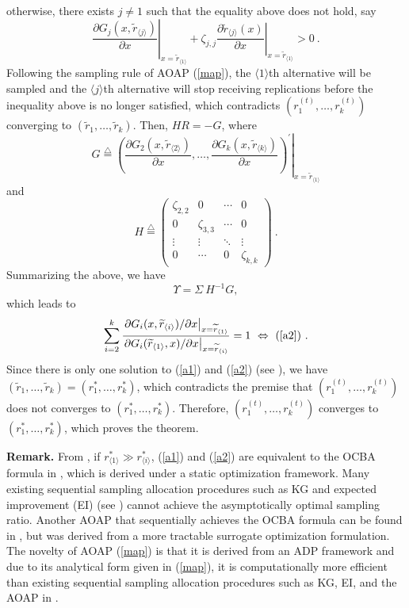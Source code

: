 \documentclass[journal]{IEEEtran}
\newcommand{\ed}{\stackrel{\triangle}{=}}
\begin{document}
\begin{IEEEproof}
     otherwise, there exists $j\neq 1$ such that the equality above does not hold, say 
      $$\left.\frac{\partial G_j(x,\widetilde{r}_{\langle j\rangle})}{\partial x}\right|_{x=\widetilde{r}_{\langle 1 \rangle}}+\zeta_{j,j}\left.\frac{\partial \widetilde{r}_{\langle j\rangle}(x)}{\partial x}\right|_{x=\widetilde{r}_{\langle 1 \rangle}}>0~.$$
      Following the sampling rule of AOAP (\ref{map}), the $\langle 1 \rangle$th alternative will be sampled and the $\langle j\rangle$th alternative will stop receiving replications before the inequality above is no longer satisfied, which contradicts $(r_1^{(t)},\ldots,r_k^{(t)})$ converging to $(\widetilde{r}_1,\ldots,\widetilde{r}_k)$. Then, $H R=-G$, where 
      $$G\ed\left.\left(\frac{\partial G_2(x,\widetilde{r}_{\langle 2\rangle})}{\partial x},\ldots,\frac{\partial G_k(x,\widetilde{r}_{\langle k\rangle})}{\partial x}\right)^{'}\right|_{x=\widetilde{r}_{\langle 1 \rangle}}$$
      and
        $$
       H\ed\left( \begin{array}{cccc}
       \zeta_{2,2} & 0&\cdots & 0\\
       0 & \zeta_{3,3}&\cdots & 0\\
        \vdots& \vdots& \ddots & \vdots \\
         0 & \cdots&0&\zeta_{k,k}        \end{array} \right)~.
        $$
        Summarizing the above, we have 
        $$\Upsilon=\Sigma~ H^{-1} G,$$
        which leads to 
        $$\sum_{i=2}^{k}\frac{\left.\partial G_i(x,\widetilde{r}_{\langle i \rangle})/\partial x\right|_{x=\widetilde{r}_{\langle 1 \rangle}}}{\left.\partial G_i(\widetilde{r}_{\langle 1 \rangle},x)/\partial x\right|_{x=\widetilde{r}_{\langle i \rangle}}}=1~\Leftrightarrow~ (\ref{a2})~.$$
   Since there is only one solution to (\ref{a1}) and (\ref{a2}) (see \cite{glynn2004large}), we have 
   $(\widetilde{r}_1,\ldots,\widetilde{r}_k)=(r_1^{*},\ldots,r_k^{*})$, which contradicts the premise that $(r_1^{(t)},\ldots,r_k^{(t)})$ does not converges to $(r_1^{*},\ldots,r_k^{*})$. Therefore, $(r_1^{(t)},\ldots,r_k^{(t)})$  converges to $(r_1^{*},\ldots,r_k^{*})$, which proves the theorem. 
 \end{IEEEproof}
\noindent\textbf{Remark.} From \cite{glynn2004large}, if $r_{\langle 1 \rangle}^{*}\gg r_{\langle i \rangle}^{*}$, (\ref{a1}) and (\ref{a2}) are equivalent to the OCBA formula in \cite{chen2000simulation}, which is derived under a static optimization framework. Many existing sequential sampling allocation procedures such as KG and expected improvement (EI) (see \cite{ryzhov2015asymptotic}) cannot achieve the asymptotically optimal sampling ratio. Another AOAP that sequentially achieves the OCBA formula can be found in \cite{peng2015asymptotic}, but was derived from a more tractable surrogate optimization formulation.  
The novelty of AOAP (\ref{map}) is that it is derived from an ADP framework and due to its analytical form given in (\ref{map}), it is computationally more efficient than existing sequential sampling allocation procedures such as KG, EI, and the AOAP in \cite{peng2015asymptotic}. 
\end{document}
